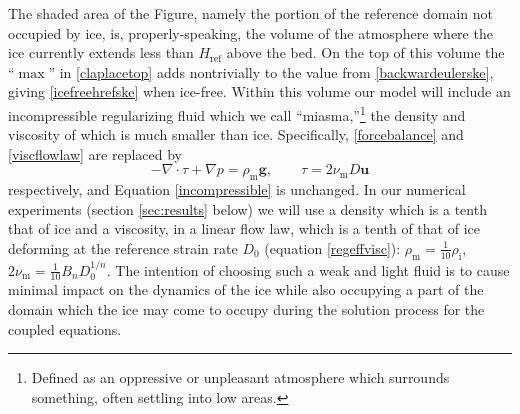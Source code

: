 \documentclass[letterpaper,final,12pt,reqno]{amsart}
\newcommand{\bg}{\mathbf{g}}
\newcommand{\bu}{\mathbf{u}}
\newcommand{\rhoi}{\rho_{\text{i}}}
\newcommand{\Href}{H_{\text{ref}}}
\newcommand{\num}{\nu_{\text{m}}}
\newcommand{\rhom}{\rho_{\text{m}}}
\begin{document}
The shaded area of the Figure, namely the portion of the reference domain not occupied by ice, is, properly-speaking, the volume of the atmosphere where the ice currently extends less than $\Href$ above the bed.  On the top of this volume the ``$\max$'' in \eqref{claplacetop} adds nontrivially to the value from \eqref{backwardeulerske}, giving \eqref{icefreehrefske} when ice-free.  Within this volume our model will include an incompressible regularizing fluid which we call ``miasma,''\footnote{Defined as an oppressive or unpleasant atmosphere which surrounds something, often settling into low areas.} the density and viscosity of which is much smaller than ice.  Specifically, \eqref{forcebalance} and \eqref{viscflowlaw} are replaced by
\begin{equation} %
- \nabla \cdot \tau + \nabla p = \rhom \bg, \qquad \tau = 2 \num D\bu \label{miasma}
\end{equation}
respectively, and Equation \eqref{incompressible} is unchanged.  In our numerical experiments (section \ref{sec:results} below) we will use a density which is a tenth that of ice and a viscosity, in a linear flow law, which is a tenth of that of ice deforming at the reference strain rate $D_0$ (equation \eqref{regeffvisc}): $\rhom = \frac{1}{10} \rhoi$, $2\num = \frac{1}{10} B_n D_0^{1/n}$.  The intention of choosing such a weak and light fluid is to cause minimal impact on the dynamics of the ice while also occupying a part of the domain which the ice may come to occupy during the solution process for the coupled equations.
\end{document}

